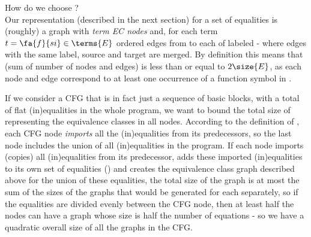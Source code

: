How do we choose ? \\
Our representation (described in the next section) for a set of equalities  is (roughly) a graph  with  \emph{term EC nodes} and, for each term $t=\fa{f}{si} \in \terms{E}$  ordered edges from  to each of  labeled  - where edges with the same label, source and target are merged.
By definition this means that  (sum of number of nodes and edges) is less than or equal to $2\size{E}$, as each node and edge correspond to at least one occurrence of a function symbol in .

If we consider a CFG that is in fact just a sequence of  basic blocks, with a total of  flat (in)equalities in the whole program, we want to bound the total size of representing the equivalence classes in all nodes.
According to the definition of , each CFG node \emph{imports} all the (in)equalities from its predecessors, so the last node includes the union of all (in)equalities in the program.
If each node imports (copies) all (in)equalities from its predecessor, adds these imported (in)equalities to its own set of equalities () and creates the equivalence class graph described above for the union of these equalities, the total size of the graph is at most the sum of the sizes of the graphs that would be generated for each  separately, so if the equalities are divided evenly between the CFG node, then at least half the nodes can have a graph whose size is half the number of equations - so we have a quadratic overall size of all the graphs in the CFG.

